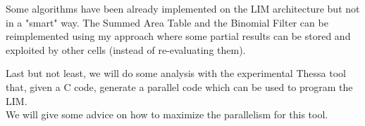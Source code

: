 \documentclass[12pt]{report}
\begin{document}
	Some algorithms have been already implemented on the LIM architecture but not in a "smart" way. The Summed Area Table and the Binomial Filter can be reimplemented using my approach where some partial results can be stored and exploited by other cells (instead of re-evaluating them).		
\vspace{1cm}

Last but not least, we will do some analysis with the experimental Thessa tool that, given a C code,  generate a parallel code which can be used to program the LIM.\\
We will give some advice on how to maximize the parallelism for this tool.

 	
	 
	
\end{document}
